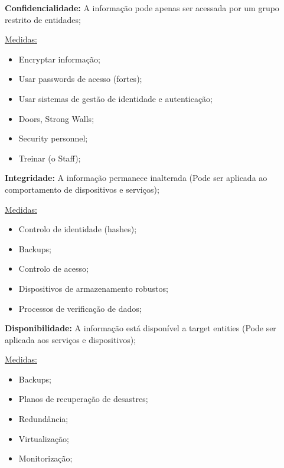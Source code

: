 \documentclass{article}
\begin{document}
\begin{flushleft}
  \textbf{Confidencialidade:} A informação pode apenas ser acessada por um grupo restrito de entidades;
  
  \vspace{2mm}

  \uline{Medidas:}
  \begin{itemize}
    \item Encryptar informação;
    \item Usar passwords de acesso (fortes);
    \item Usar sistemas de gestão de identidade e autenticação;
    \item Doors, Strong Walls;
    \item Security personnel;
    \item Treinar (o Staff);
  \end{itemize}

  \vspace{2mm}

  \textbf{Integridade:} A informação permanece inalterada (Pode ser aplicada ao comportamento de dispositivos e serviços);

  \vspace{2mm}

  \uline{Medidas:}
  \begin{itemize}
    \item Controlo de identidade (hashes);
    \item Backups;
    \item Controlo de acesso;
    \item Dispositivos de armazenamento robustos;
    \item Processos de verificação de dados;
  \end{itemize}

  \pagebreak

  \textbf{Disponibilidade:} A informação está disponível a target entities (Pode ser aplicada aos serviços e dispositivos);

  \vspace{2mm}

  \uline{Medidas:}
  \begin{itemize}
    \item Backups;
    \item Planos de recuperação de desastres;
    \item Redundância;
    \item Virtualização;
    \item Monitorização;
  \end{itemize}


\end{flushleft}
\end{document}
